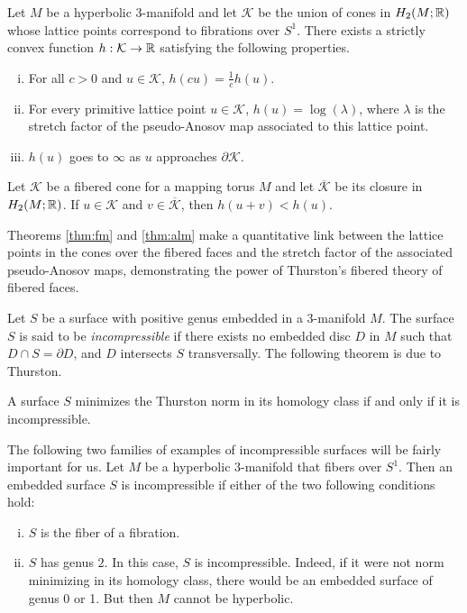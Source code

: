 \begin{thm}
  \label{thm:fm}
  Let $M$ be a hyperbolic $3$-manifold and let $\mathcal{K}$ be the union of cones in
  $H_2(M; \mathbb{R})$ whose lattice points correspond to fibrations over $S^1$.  There exists a strictly
  convex function $h: \mathcal{K} \to \mathbb{R}$ satisfying the following properties.
  \begin{enumerate}[(i)]
  \item For all $c > 0$ and $u \in \mathcal{K}$, $h(cu) =  \frac{1}{c}h(u)$.
  \item For every primitive lattice point $u \in \mathcal{K}$, $h(u) = \log(\lambda)$, where $\lambda$ is the
    stretch factor of the pseudo-Anosov map associated to this lattice point.
  \item $h(u)$ goes to $\infty$ as $u$ approaches $\partial \mathcal{K}$.
  \end{enumerate}
\end{thm}

\begin{thm}
  \label{thm:alm}
  Let $\mathcal{K}$ be a fibered cone for a mapping torus $M$ and let $\overline{\mathcal{K}}$ be its closure
  in $H_2(M;\mathbb{R})$. If $u \in \mathcal{K}$ and $v \in \overline{\mathcal{K}}$, then $h(u+v) < h(u)$.
\end{thm}
Theorems \ref{thm:fm} and \ref{thm:alm} make a quantitative link between the lattice points in the cones over
the fibered faces and the stretch factor of the associated pseudo-Anosov maps, demonstrating the power of
Thurston's fibered theory of fibered faces.

Let $S$ be a surface with positive genus embedded in a $3$-manifold $M$.  The surface $S$ is said to be {\it incompressible} if there
  exists no embedded disc $D$ in $M$ such that $D \cap S = \partial D$, and $D$ intersects $S$ transversally.  The following theorem is due to Thurston.
\begin{thm}
  A surface $S$ minimizes the Thurston norm in its homology class if and only if it is incompressible.
\end{thm}

 The following two families of examples of incompressible surfaces will be fairly important for us.
  Let $M$ be a hyperbolic $3$-manifold that fibers over $S^1$. Then an embedded surface $S$ is incompressible
  if either of the two following conditions hold:
  \begin{enumerate}[(i)]
  \item $S$ is the fiber of a fibration.
  \item $S$ has genus $2$. In this case, $S$ is incompressible.  Indeed, if it were not norm minimizing in its homology
    class, there would be an embedded surface of genus 0 or 1. But then $M$ cannot be hyperbolic.
  \end{enumerate}

